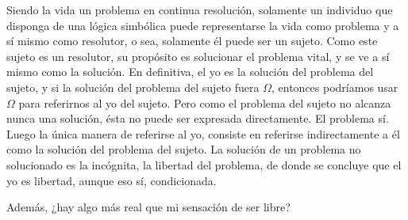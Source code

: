Siendo la vida un problema en continua resolución, solamente un individuo
que disponga de una lógica simbólica puede representarse la vida como
problema y a sí mismo como resolutor, o sea, solamente él puede ser un
sujeto. Como este sujeto es un resolutor, su propósito es solucionar el
problema vital, y se ve a sí mismo como la solución. En definitiva, el yo es
la solución del problema del sujeto, y si la solución del problema del
sujeto fuera $\Omega$, entonces podríamos usar $\Omega$ para referirnos al
yo del sujeto. Pero como el problema del sujeto no alcanza nunca una
solución, ésta no puede ser expresada directamente. El problema sí. Luego la
única manera de referirse al yo, consiste en referirse indirectamente a él
como la solución del problema del sujeto. La solución de un problema no
solucionado es la incógnita, la libertad del problema, de donde se concluye
que el yo es libertad, aunque eso sí, condicionada.

Además, ¿hay algo más real que mi sensación de ser libre?


\endinput
